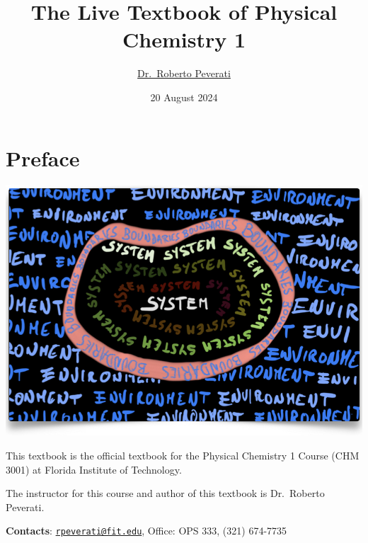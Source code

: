 \documentclass[
  9pt,
]{extbook}
\title{The Live Textbook of Physical Chemistry 1}
\author{\href{mailto:rpeverati@fit.edu}{Dr.~Roberto Peverati}}
\date{20 August 2024}
\let\oldmaketitle\maketitle
\theoremstyle{definition}
\theoremstyle{definition}
\theoremstyle{definition}
\theoremstyle{remark}
\begin{document}
\maketitle


%
\newpage

\let\maketitle\oldmaketitle

\renewcommand\thepage{\romannumeral\numexpr\value{page}-1\relax}


{
\setcounter{tocdepth}{1}
\tableofcontents
}
\renewcommand{\arraystretch}{1.8}

\hypertarget{preface}{%
\chapter*{Preface}\label{preface}}

\begin{center}\includegraphics[width=0.8\linewidth]{./img/OEP_Figures.000} \end{center}

This textbook is the official textbook for the Physical Chemistry 1 Course (CHM 3001) at Florida Institute of Technology.

The instructor for this course and author of this textbook is Dr.~Roberto Peverati.

\textbf{Contacts}: \href{mailto:rpeverati@fit.edu}{\nolinkurl{rpeverati@fit.edu}}, Office: OPS 333, (321) 674-7735
\end{document}
